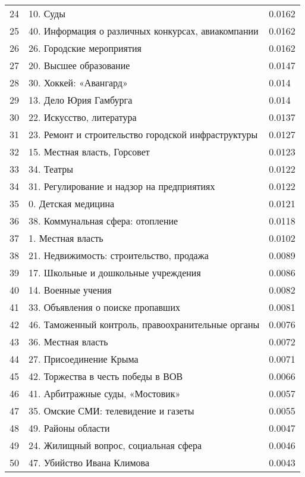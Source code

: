 \begin{longtable}[c]{| L{3cm} | C{7cm} | R{5cm} |}
24 & 10. Суды & 0.0162 \\
25 & 40. Информация о различных конкурсах, авиакомпании & 0.0162 \\
26 & 26. Городские мероприятия & 0.0162 \\
27 & 20. Высшее образование & 0.0147 \\
28 & 30. Хоккей: «Авангард» & 0.014 \\
29 & 13. Дело Юрия Гамбурга & 0.014 \\
30 & 22. Искусство, литература & 0.0137 \\
31 & 23. Ремонт и строительство городской инфраструктуры & 0.0127 \\
32 & 15. Местная власть, Горсовет & 0.0123 \\
33 & 34. Театры & 0.0122 \\
34 & 31. Регулирование и надзор на предприятиях & 0.0122 \\
35 & 0. Детская медицина & 0.0121 \\
36 & 38. Коммунальная сфера: отопление & 0.0118 \\
37 & 1. Местная власть & 0.0102 \\
38 & 21. Недвижимость: строительство, продажа & 0.0089 \\
39 & 17. Школьные и дошкольные учреждения & 0.0086 \\
40 & 14. Военные учения & 0.0082 \\
41 & 33. Объявления о поиске пропавших & 0.0081 \\
42 & 46. Таможенный контроль, правоохранительные органы & 0.0076 \\
43 & 36. Местная власть & 0.0072 \\
44 & 27. Присоединение Крыма & 0.0071 \\
45 & 42. Торжества в честь победы в ВОВ & 0.0066 \\
46 & 41. Арбитражные суды, «Мостовик» & 0.0057 \\
47 & 35. Омские СМИ: телевидение и газеты & 0.0055 \\
48 & 49. Районы области & 0.0047 \\
49 & 24. Жилищный вопрос, социальная сфера & 0.0046 \\
50 & 47. Убийство Ивана Климова & 0.0043 \\
	\hline
\end{longtable}

